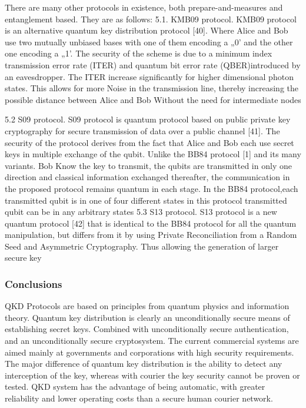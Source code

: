 There are many other protocols in existence, both prepare-and-measures and entanglement based. They are as follows:
5.1. KMB09 protocol. KMB09 protocol is an alternative quantum key distribution protocol [40]. Where Alice and Bob use two mutually unbiased bases with one of them encoding a „0' and the other one encoding a „1'. The security of the scheme is due to a minimum index transmission error rate (ITER) and quantum bit error rate (QBER)introduced by an eavesdropper.
The ITER increase significantly for higher dimensional photon states. This allows for more Noise in the transmission line, thereby increasing the possible distance between Alice and Bob Without the need for intermediate nodes

5.2 S09 protocol. S09 protocol is quantum protocol based on public private key cryptography for secure transmission of data over a public channel [41]. The security of the protocol derives from the fact that Alice and Bob each use secret keys in multiple exchange of the qubit. Unlike the BB84 protocol [1] and its many variants. Bob Know the key to transmit, the qubits are transmitted in only one direction and classical information exchanged thereafter, the communication in the proposed protocol remains quantum in each stage. In the BB84 protocol,each transmitted qubit is in one of four different states in this protocol transmitted qubit can be in any arbitrary states
5.3 S13 protocol. S13 protocol is a new quantum protocol [42] that is identical to the BB84 protocol for all the quantum manipulation, but differs from it by using Private Reconciliation from a Random Seed and Asymmetric Cryptography. Thus allowing the generation of larger secure key

\subsubsection{Conclusions}
QKD Protocols are based on principles from quantum physics and information theory. Quantum key distribution is clearly an unconditionally secure means of establishing secret keys. Combined with unconditionally secure authentication, and an unconditionally secure cryptosystem.
The current commercial systems are aimed mainly at governments and corporations with high security requirements. The major difference of quantum key distribution is the ability to detect any interception of the key, whereas with courier the key security cannot be proven or tested. QKD system has the advantage of being automatic, with greater reliability and lower operating costs than a secure human courier network.

